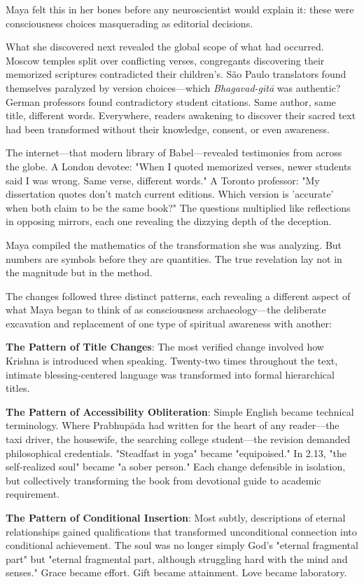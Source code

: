 \documentclass[12pt,twoside]{book}
\begin{document}
Maya felt this in her bones before any neuroscientist would explain it: these were consciousness choices masquerading as editorial decisions.

What she discovered next revealed the global scope of what had occurred. Moscow temples split over conflicting verses, congregants discovering their memorized scriptures contradicted their children's. São Paulo translators found themselves paralyzed by version choices—which \emph{Bhagavad-gītā} was authentic? German professors found contradictory student citations. Same author, same title, different words. Everywhere, readers awakening to discover their sacred text had been transformed without their knowledge, consent, or even awareness.

The internet—that modern library of Babel—revealed testimonies from across the globe. A London devotee: "When I quoted memorized verses, newer students said I was wrong. Same verse, different words." A Toronto professor: "My dissertation quotes don't match current editions. Which version is 'accurate' when both claim to be the same book?" The questions multiplied like reflections in opposing mirrors, each one revealing the dizzying depth of the deception.

Maya compiled the mathematics of the transformation she was analyzing. But numbers are symbols before they are quantities. The true revelation lay not in the magnitude but in the method.

The changes followed three distinct patterns, each revealing a different aspect of what Maya began to think of as consciousness archaeology—the deliberate excavation and replacement of one type of spiritual awareness with another:

\textbf{\textbf{The Pattern of Title Changes}}: The most verified change involved how Krishna is introduced when speaking. Twenty-two times throughout the text, intimate blessing-centered language was transformed into formal hierarchical titles.

\textbf{\textbf{The Pattern of Accessibility Obliteration}}: Simple English became technical terminology. Where Prabhupāda had written for the heart of any reader—the taxi driver, the housewife, the searching college student—the revision demanded philosophical credentials. "Steadfast in yoga" became "equipoised." In 2.13, "the self-realized soul" became "a sober person." Each change defensible in isolation, but collectively transforming the book from devotional guide to academic requirement.

\textbf{\textbf{The Pattern of Conditional Insertion}}: Most subtly, descriptions of eternal relationships gained qualifications that transformed unconditional connection into conditional achievement. The soul was no longer simply God's "eternal fragmental part" but "eternal fragmental part, although struggling hard with the mind and senses." Grace became effort. Gift became attainment. Love became laboratory.
\end{document}
